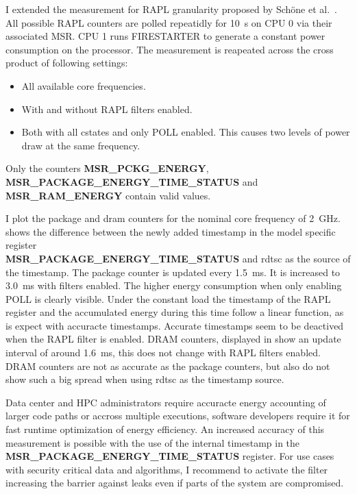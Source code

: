 I extended the measurement for RAPL granularity proposed by Schöne et al.~\cite{Schoene_2024_Alder_Lake}.
All possible RAPL counters are polled repeatidly for \SI{10}{\s} on CPU 0 via their associated MSR.
CPU 1 runs FIRESTARTER to generate a constant power consumption on the processor.
The measurement is reapeated across the cross product of following settings:
\begin{itemize}
    \item All available core frequencies.
    \item With and without RAPL filters enabled.
    \item Both with all cstates and only POLL enabled.
    This causes two levels of power draw at the same frequency.
\end{itemize}
Only the counters \textbf{MSR\_PCKG\_ENERGY}, \textbf{MSR\_PACKAGE\_ENERGY\_TIME\_STATUS} and\\ \textbf{MSR\_RAM\_ENERGY} contain valid values.

I plot the package and dram counters for the nominal core frequency of \SI{2}{\GHz}.
 shows the difference between the newly added timestamp in the model specific register\\ \textbf{MSR\_PACKAGE\_ENERGY\_TIME\_STATUS} and rdtsc as the source of the timestamp.
The package counter is updated every \SI{1.5}{\ms}.
It is increased to \SI{3.0}{\ms} with filters enabled.
The higher energy consumption when only enabling POLL is clearly visible.
Under the constant load the timestamp of the RAPL register and the accumulated energy during this time follow a linear function, as is expect with accuracte timestamps.
Accurate timestamps seem to be deactived when the RAPL filter is enabled.
DRAM counters, displayed in  show an update interval of around \SI{1.6}{\ms}, this does not change with RAPL filters enabled.
DRAM counters are not as accurate as the package counters, but also do not show such a big spread when using rdtsc as the timestamp source.

Data center and HPC administrators require accuracte energy accounting of larger code paths or accross multiple executions, software developers require it for fast runtime optimization of energy efficiency.
An increased accuracy of this measurement is possible with the use of the internal timestamp in the \textbf{MSR\_PACKAGE\_ENERGY\_TIME\_STATUS} register.
For use cases with security critical data and algorithms, I recommend to activate the filter increasing the barrier against leaks even if parts of the system are compromised.

